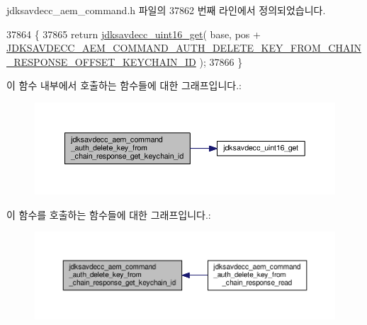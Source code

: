 jdksavdecc\+\_\+aem\+\_\+command.\+h 파일의 37862 번째 라인에서 정의되었습니다.


\begin{DoxyCode}
37864 \{
37865     \textcolor{keywordflow}{return} \hyperlink{group__endian_ga3fbbbc20be954aa61e039872965b0dc9}{jdksavdecc\_uint16\_get}( base, pos + 
      \hyperlink{group__command__auth__delete__key__from__chain__response_gaf36fe9443e53b439212c599f8a186ca5}{JDKSAVDECC\_AEM\_COMMAND\_AUTH\_DELETE\_KEY\_FROM\_CHAIN\_RESPONSE\_OFFSET\_KEYCHAIN\_ID}
       );
37866 \}
\end{DoxyCode}


이 함수 내부에서 호출하는 함수들에 대한 그래프입니다.\+:
\nopagebreak
\begin{figure}[H]
\begin{center}
\leavevmode
\includegraphics[width=350pt]{group__command__auth__delete__key__from__chain__response_gab222b1bc3f4d03164c7c4fd666247167_cgraph}
\end{center}
\end{figure}




이 함수를 호출하는 함수들에 대한 그래프입니다.\+:
\nopagebreak
\begin{figure}[H]
\begin{center}
\leavevmode
\includegraphics[width=350pt]{group__command__auth__delete__key__from__chain__response_gab222b1bc3f4d03164c7c4fd666247167_icgraph}
\end{center}
\end{figure}


